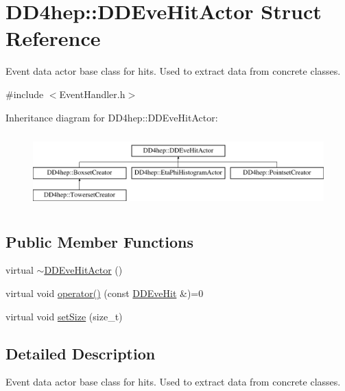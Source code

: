 \hypertarget{struct_d_d4hep_1_1_d_d_eve_hit_actor}{}\section{D\+D4hep\+:\+:D\+D\+Eve\+Hit\+Actor Struct Reference}
\label{struct_d_d4hep_1_1_d_d_eve_hit_actor}


Event data actor base class for hits. Used to extract data from concrete classes.  




{\ttfamily \#include $<$Event\+Handler.\+h$>$}

Inheritance diagram for D\+D4hep\+:\+:D\+D\+Eve\+Hit\+Actor\+:\begin{figure}[H]
\begin{center}
\leavevmode
\includegraphics[height=2.871795cm]{struct_d_d4hep_1_1_d_d_eve_hit_actor}
\end{center}
\end{figure}
\subsection*{Public Member Functions}
\begin{DoxyCompactItemize}
\item 
virtual \hyperlink{struct_d_d4hep_1_1_d_d_eve_hit_actor_a9706da47b8da6351434ea0f9d41d19d4}{$\sim$\+D\+D\+Eve\+Hit\+Actor} ()
\item 
virtual void \hyperlink{struct_d_d4hep_1_1_d_d_eve_hit_actor_a612a0a84bfe41620203555b044019788}{operator()} (const \hyperlink{class_d_d4hep_1_1_d_d_eve_hit}{D\+D\+Eve\+Hit} \&)=0
\item 
virtual void \hyperlink{struct_d_d4hep_1_1_d_d_eve_hit_actor_afb0005607761c55de470605dd4cc2acd}{set\+Size} (size\+\_\+t)
\end{DoxyCompactItemize}


\subsection{Detailed Description}
Event data actor base class for hits. Used to extract data from concrete classes. 


